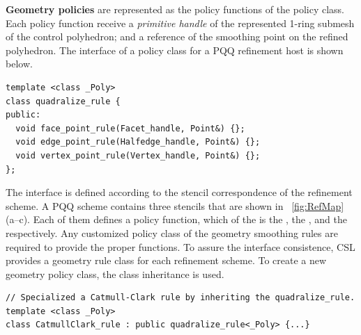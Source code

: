 \noindent \textbf{Geometry policies} are represented as
the policy functions of the policy class. Each policy function
receive a \emph{primitive handle} of the represented 1-ring submesh 
of the control polyhedron; and a reference of the smoothing point
on the refined polyhedron. The interface of a policy class for a PQQ
refinement host is shown below.
\begin{lstlisting}
template <class _Poly>
class quadralize_rule {
public:
  void face_point_rule(Facet_handle, Point&) {};
  void edge_point_rule(Halfedge_handle, Point&) {};
  void vertex_point_rule(Vertex_handle, Point&) {};
};
\end{lstlisting}
The interface is defined according to the stencil correspondence of
the refinement scheme. A PQQ scheme contains three stencils that are
shown in \figurename\ \ref{fig:RefMap} (a--c). Each of them
defines a policy function, which of the  
is the , 
the , and the  
respectively. Any customized policy class of the geometry 
smoothing rules are required to provide the proper functions.
To assure the interface consistence, CSL provides
a geometry rule class for each refinement scheme. To create a new
geometry policy class, the class inheritance is used.
\begin{lstlisting}
// Specialized a Catmull-Clark rule by inheriting the quadralize_rule.
template <class _Poly>
class CatmullClark_rule : public quadralize_rule<_Poly> {...}
\end{lstlisting}

